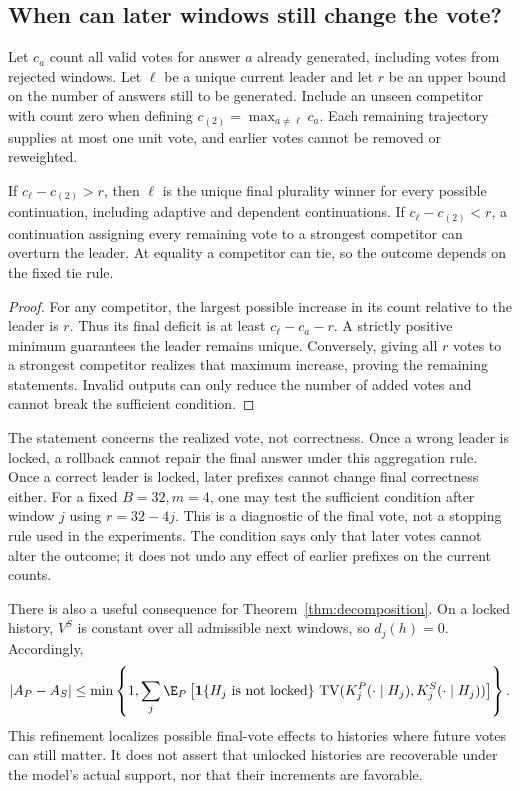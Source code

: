 \subsection{When can later windows still change the vote?}
Let $c_a$ count all valid votes for answer $a$ already generated, including votes from rejected windows. Let $\ell$ be a unique current leader and let $r$ be an upper bound on the number of answers still to be generated. Include an unseen competitor with count zero when defining $c_{(2)}=\max_{a\ne\ell}c_a$. Each remaining trajectory supplies at most one unit vote, and earlier votes cannot be removed or reweighted.

\begin{proposition}
\label{prop:lock}
If $c_\ell-c_{(2)}>r$, then $\ell$ is the unique final plurality winner for every possible continuation, including adaptive and dependent continuations. If $c_\ell-c_{(2)}<r$, a continuation assigning every remaining vote to a strongest competitor can overturn the leader. At equality a competitor can tie, so the outcome depends on the fixed tie rule.
\end{proposition}
\begin{proof}
For any competitor, the largest possible increase in its count relative to the leader is $r$. Thus its final deficit is at least $c_\ell-c_a-r$. A strictly positive minimum guarantees the leader remains unique. Conversely, giving all $r$ votes to a strongest competitor realizes that maximum increase, proving the remaining statements. Invalid outputs can only reduce the number of added votes and cannot break the sufficient condition.
\end{proof}

The statement concerns the realized vote, not correctness. Once a wrong leader is locked, a rollback cannot repair the final answer under this aggregation rule. Once a correct leader is locked, later prefixes cannot change final correctness either. For a fixed $B=32,m=4$, one may test the sufficient condition after window $j$ using $r=32-4j$. This is a diagnostic of the final vote, not a stopping rule used in the experiments. The condition says only that later votes cannot alter the outcome; it does not undo any effect of earlier prefixes on the current counts.

There is also a useful consequence for Theorem~\ref{thm:decomposition}. On a locked history, $V^S$ is constant over all admissible next windows, so $d_j(h)=0$. Accordingly,
\[
 |A_P-A_S|\leq\min\left\{1,\sum_j\E_P\left[
 \ind\{H_j\text{ is not locked}\}\,
 \TV(K_j^P(\cdot\mid H_j),K_j^S(\cdot\mid H_j))\right]\right\}.
\]
This refinement localizes possible final-vote effects to histories where future votes can still matter. It does not assert that unlocked histories are recoverable under the model's actual support, nor that their increments are favorable.

